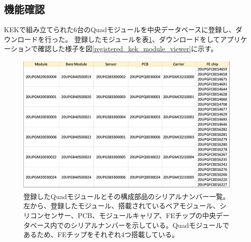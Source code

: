 \subsection{機能確認}
KEKで組み立てられた6台のQuadモジュールを中央データベースに登録し、ダウンロードを行った。
登録したモジュールを表\ref{registered_kek_module}、ダウンロードをしてアプリケーションで確認した様子を図\ref{registered_kek_module_viewer}に示す。

\begin{figure}[bpt]\centering
\includegraphics[width=12cm]{./registered_kek_module.png}
\caption[登録したQuadモジュールと構成部品のシリアルナンバー一覧。]{登録したQuadモジュールとその構成部品のシリアルナンバー一覧。左から、登録したモジュール、搭載されているベアモジュール、シリコンセンサー、PCB、モジュールキャリア、FEチップの中央データベース内でのシリアルナンバーを示している。Quadモジュールであるため、FEチップをそれぞれ4つ搭載している。}
\label{registered_kek_module}
\end{figure}

